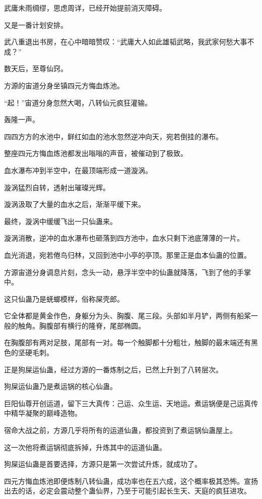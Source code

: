 \begin{this_body}
武庸未雨绸缪，思虑周详，已经开始提前消灭障碍。

又是一番计划安排。

武八重退出书房，在心中暗暗赞叹：“武庸大人如此雄韬武略，我武家何愁大事不成？”

数天后，至尊仙窍。

方源的宙道分身坐镇四元方悔血炼池。

“起！”宙道分身忽然大喝，八转仙元疯狂灌输。

轰隆一声。

四四方方的水池中，鲜红如血的池水忽然逆冲向天，宛若倒挂的瀑布。

整座四元方悔血炼池都发出嗡嗡的声音，被催动到了极致。

血水瀑布冲到半空中，在最顶端形成一道漩涡。

漩涡猛烈自转，透射出璀璨光辉。

漩涡汲取了大量的血水之后，渐渐平缓下来。

最终，漩涡中缓缓飞出一只仙蛊来。

漩涡消散，逆冲的血水瀑布也砸落到四方池中，血水只剩下池底薄薄的一片。

血光消退，宛若倦鸟归林，又回到池中小亭的亭顶。那里正是血本仙蛊的位置。

方源宙道分身调息片刻，念头一动，悬浮半空中的仙蛊就降落，飞到了他的手掌中。

这只仙蛊乃是蜣螂模样，俗称屎壳郎。

它全体都是黄金作色，身躯分为头、胸腹、尾三段。头部如半月铲，两侧有船桨一般的触角。胸腹部有横行的隆脊，尾部椭圆。

在胸腹部有两对足肢，尾部有一对。每一个触脚都十分粗壮，触脚的最末端还有黑色的坚硬毛刺。

正是狗屎运仙蛊，经过方源的一番炼制之后，已然上升到了八转层次。

狗屎运仙蛊乃是煮运锅的核心仙蛊。

巨阳仙尊开创运道，留下三大真传：己运、众生运、天地运。煮运锅便是己运真传中精华凝聚的巅峰造物。

宿命大战之前，方源几乎将所有的运道仙蛊，都投资到了煮运锅仙蛊屋上。

这一次他将煮运锅彻底拆掉，升炼其中的运道仙蛊。

狗屎运仙蛊是首要选择，方源只是第一次尝试升炼，就成功了。

四元方悔血炼池即便炼制八转仙蛊，成功率也在五六成，这个概率极其恐怖。宣扬出去的话，必定会震动整个蛊仙界，乃至于可能引起长生天、天庭的疯狂进攻。


\end{this_body}
